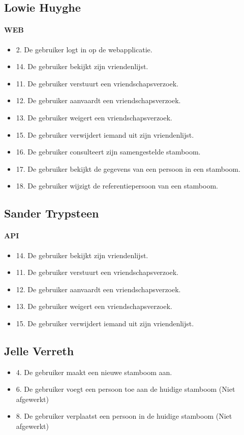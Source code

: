 \documentclass[pdftex,a4paper,12pt,twoside]{report}
\begin{document}
\subsection{Lowie Huyghe}
\paragraph{WEB}
\begin{itemize}
\item 2. De gebruiker logt in op de webapplicatie.
\item 14. De gebruiker bekijkt zijn vriendenlijst.
\item 11. De gebruiker verstuurt een vriendschapsverzoek.
\item 12. De gebruiker aanvaardt een vriendschapsverzoek.
\item 13. De gebruiker weigert een vriendschapsverzoek.
\item 15. De gebruiker verwijdert iemand uit zijn vriendenlijst.
\item 16. De gebruiker consulteert zijn samengestelde stamboom.
\item 17. De gebruiker bekijkt de gegevens van een persoon in een stamboom.
\item 18. De gebruiker wijzigt de referentiepersoon van een stamboom.
\end{itemize}
\subsection{Sander Trypsteen}
\paragraph{API}
\begin{itemize}
\item 14. De gebruiker bekijkt zijn vriendenlijst.
\item 11. De gebruiker verstuurt een vriendschapsverzoek.
\item 12. De gebruiker aanvaardt een vriendschapsverzoek.
\item 13. De gebruiker weigert een vriendschapsverzoek.
\item 15. De gebruiker verwijdert iemand uit zijn vriendenlijst.
\end{itemize}
\subsection{Jelle Verreth}
\begin{itemize}
\item 4. De gebruiker maakt een nieuwe stamboom aan.
\item 6. De gebruiker voegt een persoon toe aan de huidige stamboom 
(Niet afgewerkt)
\item 8. De gebruiker verplaatst een persoon in de huidige stamboom 
(Niet afgewerkt)
\end{itemize}
\end{document}
